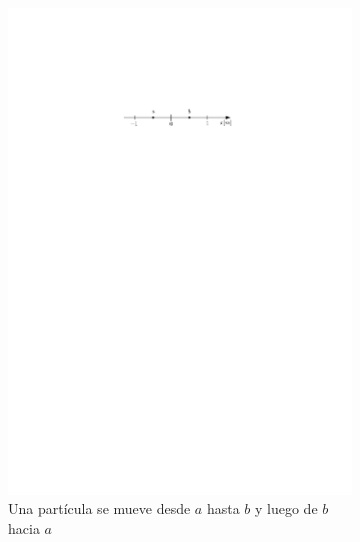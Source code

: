 \begin{comprension}
\begin{figure}[H]
\begin{subfigure}{0.5\textwidth}
 	\includegraphics[width=.9\linewidth]{img/p_t_d_ej3.pdf}
	\caption{Una partícula se mueve desde $a$ hasta $b$ y luego de $b$ hacia $a$}	
\end{subfigure} 
 \begin{subfigure}{0.5\textwidth}
    \centering

\end{subfigure}
\end{figure}
\end{comprension}
